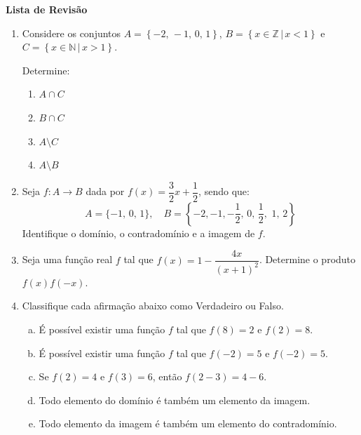\documentclass[12pt,a4paper]{article}
\begin{document}
\begin{center}
  \textbf{Lista de Revisão}
\end{center}

\begin{enumerate}
  \item Considere os conjuntos $A = \left\{-2,\,-1,\,0,\,1\right\}$,
    $B = \left\{x\in\mathbb{Z} \,|\, x < 1\right\}$ e
    $C = \left\{x\in\mathbb{N} \,|\, x > 1\right\}$.

    Determine:
    \begin{enumerate}
      \item $A\cap C$
      \item $B\cap C$
      \item $A\setminus C$
      \item $A\setminus B$
    \end{enumerate}
    

  \item Seja $f:A\to B$ dada por $f(x) = \dfrac{3}{2}x + \dfrac{1}{2}$, sendo que:
    $$A = \{-1,\,0,\,1\},\quad B = \left\{-2,-1,-\frac{1}{2},\,0,\,\frac{1}{2},\,\,1,\,2\right\}$$
    Identifique o domínio, o contradomínio e a imagem de $f$.
  
  \item Seja uma função real $f$ tal que $f(x) = 1 - \dfrac{4x}{(x+1)^2}$.
  Determine o produto $f(x)f(-x)$.
  
  \item Classifique cada afirmação abaixo como Verdadeiro ou Falso.
    \begin{enumerate}[(a)]
      \item É possível existir uma função $f$ tal que $f(8) = 2$ e $f(2) = 8$.
      \item É possível existir uma função $f$ tal que $f(-2) = 5$ e $f(-2) = 5$.
      \item Se $f(2) = 4$ e $f(3) = 6$, então $f(2 - 3) = 4 - 6$.
      \item Todo elemento do domínio é também um elemento da imagem.
      \item Todo elemento da imagem é também um elemento do contradomínio.
    \end{enumerate}
    
\end{enumerate}
\end{document}
